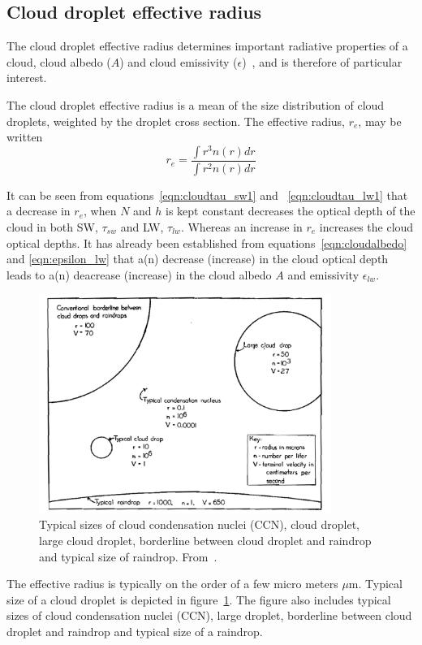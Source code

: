 \subsection{Cloud droplet effective radius}
The cloud droplet effective radius determines important radiative properties of a cloud, cloud albedo ($A$) and cloud emissivity ($\epsilon$)~\citep{Hansen1974}, and is therefore of particular interest. 

The cloud droplet effective radius is a mean of the size distribution of cloud droplets, weighted by the droplet cross section. The effective radius, $r_e$, may be written
\begin{equation}
r_e = \frac{\int r^3 n(r) dr}{\int r^2 n(r) dr}
\end{equation}

It can be seen from equations~\ref{eqn:cloudtau_sw1} and ~\ref{eqn:cloudtau_lw1} that a decrease in $r_e$, when $N$ and $h$ is kept constant decreases the optical depth of the cloud in both SW, $\tau_{sw}$ and LW, $\tau_{lw}$. Whereas an increase in $r_e$ increases the cloud optical depths. It has already been established from equations~\ref{eqn:cloudalbedo} and \ref{eqn:epsilon_lw} that a(n) decrease (increase) in the cloud optical depth leads to a(n) deacrease (increase) in the cloud albedo $A$ and emissivity $\epsilon_{lw}$.

\begin{figure}
\centering
\includegraphics[width=0.85\textwidth]{theory/dropletsize.png}
\caption{Typical sizes of cloud condensation nuclei (CCN), cloud droplet, large cloud droplet, borderline between cloud droplet and raindrop and typical size of raindrop.%
 From~\citep{McDonald1958}.}
\label{fig:dropletsize}
\end{figure}
The effective radius is typically on the order of a few micro meters $\mu\text{m}$. Typical size of a cloud droplet is depicted in figure~\ref{fig:dropletsize}. The figure also includes typical sizes of cloud condensation nuclei (CCN), large droplet, borderline between cloud droplet and raindrop and typical size of a raindrop.


